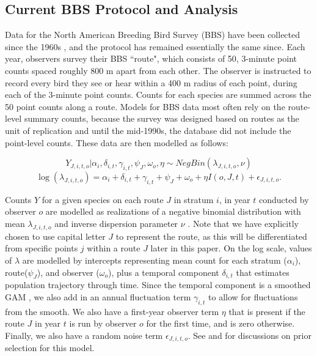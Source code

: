 \documentclass[12pt]{article}
\begin{document}
\subsection{Current BBS Protocol and Analysis}

\par Data for the North American Breeding Bird Survey (BBS) have been collected since the 1960s \citep{hudson_role_2017, sauer_first_2017}, and the protocol has remained essentially the same since. 
Each year, observers survey their BBS ``route", which consists of 50, 3-minute point counts spaced roughly 800 m apart from each other. 
The observer is instructed to record every bird they see or hear within a 400 m radius of each point, during each of the 3-minute point counts. 
Counts for each species are summed across the 50 point counts along a route.
Models for BBS data most often rely on the route-level summary counts, because the survey was designed based on routes as the unit of replication and until the mid-1990s, the database did not include the point-level counts.
These data are then modelled as follows:

\begin{equation*}
	Y_{J,i,t,o} | \alpha_i, \delta_{i,t}, \gamma_{i,t}, \psi_J, \omega_o, \eta \sim NegBin(\lambda_{J,i,t,o}, \nu)
\end{equation*}
\begin{equation}\label{bbs}
\log(\lambda_{J,i,t,o}) = \alpha_i + \delta_{i,t} + \gamma_{i,t} + \psi_J + \omega_o + \eta I(o,J,t) + \epsilon_{J,i,t,o}.
\end{equation}

Counts $Y$ for a given species on each route $J$ in stratum $i$, in year $t$ conducted by observer $o$ are modelled as realizations of a negative binomial distribution with mean $\lambda_{J,i,t,o}$ and inverse dispersion parameter $\nu$ \citet{smith_spatially_2023}. 
Note that we have explicitly chosen to use capital letter $J$ to represent the route, as this will be differentiated from specific points $j$ within a route $J$ later in this paper.
On the log scale, values of $\lambda$ are modelled by intercepts representing mean count for each stratum ($\alpha_i$), route($\psi_J$), and observer ($\omega_o$), plus a temporal component $\delta_{i,t}$ that estimates population trajectory through time. 
Since the temporal component is a smoothed GAM \citep{smith_north_2021}, we also add in an annual fluctuation term $\gamma_{i,t}$ to allow for fluctuations from the smooth. 
We also have a first-year observer term $\eta$ that is present if the route $J$ in year $t$ is run by observer $o$ for the first time, and is zero otherwise. 
Finally, we also have a random noise term $\epsilon_{J,i,t,o}$.
See \citet{smith_north_2021} and \citet{smith_spatially_2023} for discussions on prior selection for this model.
\end{document}
